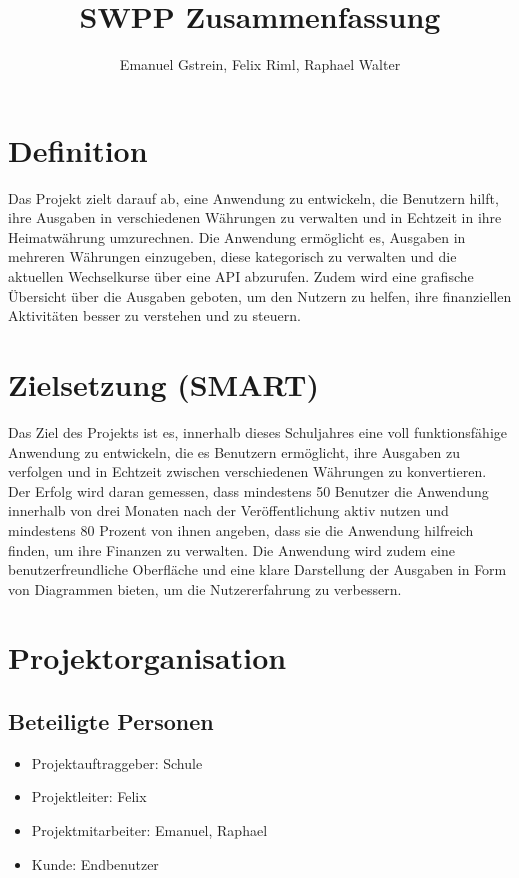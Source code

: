 \documentclass[ngerman]{report}
\title{SWPP Zusammenfassung}
\author{Emanuel Gstrein, Felix Riml, Raphael Walter}
\begin{document}
    \maketitle

    \newpage
    \tableofcontents
    \newpage

    \section{Definition}
    Das Projekt zielt darauf ab, eine Anwendung zu entwickeln, die Benutzern hilft, ihre Ausgaben in verschiedenen Währungen zu verwalten und in Echtzeit in ihre Heimatwährung umzurechnen. 
    Die Anwendung ermöglicht es, Ausgaben in mehreren Währungen einzugeben, diese kategorisch zu verwalten und die aktuellen Wechselkurse über eine API abzurufen. Zudem wird eine grafische 
    Übersicht über die Ausgaben geboten, um den Nutzern zu helfen, ihre finanziellen Aktivitäten besser zu verstehen und zu steuern.
    
    \section{Zielsetzung (SMART)}
    Das Ziel des Projekts ist es, innerhalb dieses Schuljahres
    eine voll funktionsfähige Anwendung zu entwickeln,
    die es Benutzern ermöglicht, ihre Ausgaben zu verfolgen
    und in Echtzeit zwischen verschiedenen Währungen zu konvertieren.
    Der Erfolg wird daran gemessen, dass mindestens 50 Benutzer
    die Anwendung innerhalb von drei Monaten nach der Veröffentlichung
    aktiv nutzen und mindestens 80 Prozent von ihnen angeben, dass sie die
    Anwendung hilfreich finden, um ihre Finanzen zu verwalten.
    Die Anwendung wird zudem eine benutzerfreundliche Oberfläche
    und eine klare Darstellung der Ausgaben in Form von Diagrammen bieten,
    um die Nutzererfahrung zu verbessern.

    \section{Projektorganisation}
    \subsection{Beteiligte Personen}
    \begin{itemize}
        \item Projektauftraggeber: Schule
        \item Projektleiter: Felix
        \item Projektmitarbeiter: Emanuel, Raphael
        \item Kunde: Endbenutzer
    \end{itemize}



 
\end{document}

